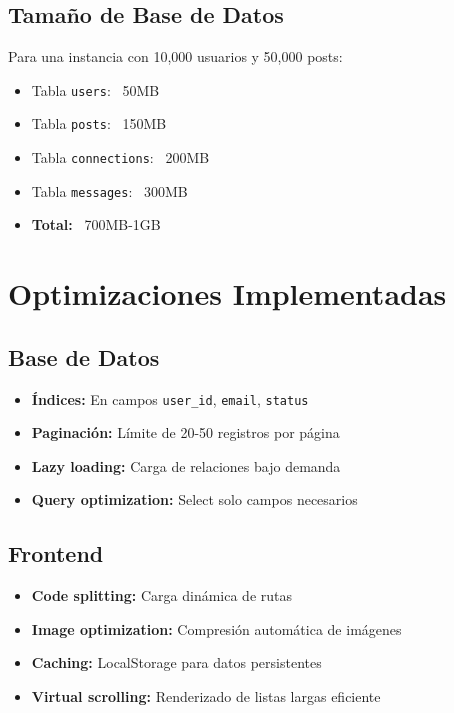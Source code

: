 \documentclass[a4paper]{report}
\begin{document}
\subsection{Tamaño de Base de Datos}

Para una instancia con 10,000 usuarios y 50,000 posts:

\begin{itemize}
  \item Tabla \texttt{users}: ~50MB
  \item Tabla \texttt{posts}: ~150MB
  \item Tabla \texttt{connections}: ~200MB
  \item Tabla \texttt{messages}: ~300MB
  \item \textbf{Total:} ~700MB-1GB
\end{itemize}

\section{Optimizaciones Implementadas}

\subsection{Base de Datos}

\begin{itemize}
  \item \textbf{Índices:} En campos \texttt{user\_id}, \texttt{email}, \texttt{status}
  \item \textbf{Paginación:} Límite de 20-50 registros por página
  \item \textbf{Lazy loading:} Carga de relaciones bajo demanda
  \item \textbf{Query optimization:} Select solo campos necesarios
\end{itemize}

\subsection{Frontend}

\begin{itemize}
  \item \textbf{Code splitting:} Carga dinámica de rutas
  \item \textbf{Image optimization:} Compresión automática de imágenes
  \item \textbf{Caching:} LocalStorage para datos persistentes
  \item \textbf{Virtual scrolling:} Renderizado de listas largas eficiente
\end{itemize}
\end{document}
